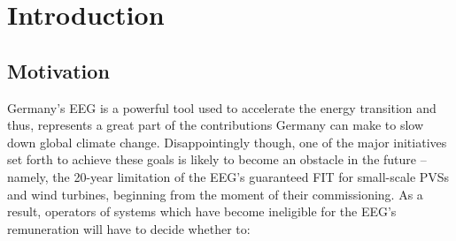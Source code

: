 

\chapter{Introduction}
\label{chp:introduction}

\section{Motivation}
\label{sec:motivation}

Germany's \ac{EEG} is a powerful tool used to accelerate the energy transition and thus, represents a great part of the contributions Germany can make to slow down global climate change. Disappointingly though, one of the major initiatives set forth to achieve these goals is likely to become an obstacle in the future -- namely, the 20-year limitation of the \ac{EEG}'s guaranteed \ac{FIT} for small-scale \acp{PVS} and wind turbines, beginning from the moment of their commissioning. As a result, operators of systems which have become ineligible for the \acs{EEG}'s remuneration will have to decide whether to:

